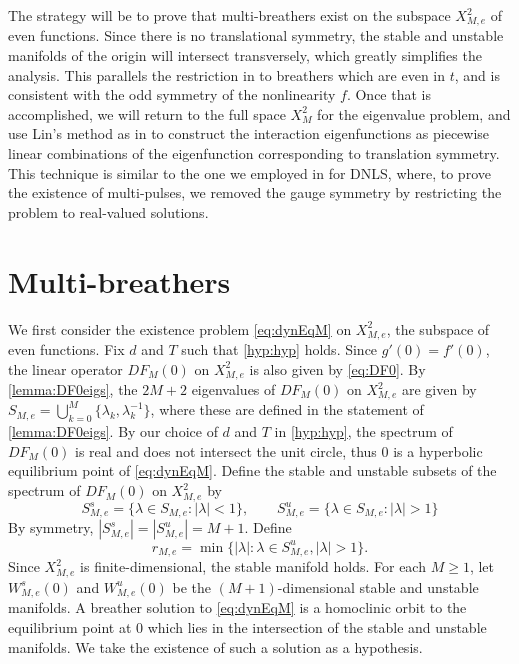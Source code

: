 \documentclass[12pt,reqno]{amsart}
\begin{document}
The strategy will be to prove that multi-breathers exist on the subspace $X_{M,e}^2$ of even functions. Since there is no translational symmetry, the stable and unstable manifolds of the origin will intersect transversely, which greatly simplifies the analysis. This parallels the restriction in \cite{Pelinovsky2012} to breathers which are even in $t$, and is consistent with the odd symmetry of the nonlinearity $f$. 
Once that is accomplished, we will return to the full space $X_{M}^2$ for the eigenvalue problem, and use Lin's method as in \cites{Parker2021,Parker2020,Sandstede1998} to construct the interaction eigenfunctions as piecewise linear combinations of the eigenfunction corresponding to translation symmetry. This technique is similar to the one we employed in \cite{Parker2020} for DNLS, where, to prove the existence of multi-pulses, we removed the gauge symmetry by restricting the problem to real-valued solutions.

\section{Multi-breathers}

We first consider the existence problem \cref{eq:dynEqM} on $X_{M,e}^2$, the subspace of even functions. Fix $d$ and $T$ such that \cref{hyp:hyp} holds. Since $g'(0) = f'(0)$, the linear operator $DF_M(0)$ on $X_{M,e}^2$ is also given by \cref{eq:DF0}. By \cref{lemma:DF0eigs}, the $2M+2$ eigenvalues of $DF_M(0)$ on $X_{M,e}^2$ are given by $S_{M,e} = \bigcup_{k=0}^M \{\lambda_k, \lambda_k^{-1} \}$, where these are defined in the statement of \cref{lemma:DF0eigs}. By our choice of $d$ and $T$ in \cref{hyp:hyp}, the spectrum of $DF_M(0)$ is real and does not intersect the unit circle, thus 0 is a hyperbolic equilibrium point of \cref{eq:dynEqM}. Define the stable and unstable subsets of the spectrum of $DF_M(0)$ on $X_{M,e}^2$ by
\[
S_{M,e}^s = \{ \lambda \in S_{M,e} : |\lambda| < 1\}, \qquad S_{M,e}^u = \{ \lambda \in S_{M,e} : |\lambda| > 1\}
\]
By symmetry, $|S_{M,e}^s| = |S_{M,e}^u| = M+1$. Define
\begin{equation}\label{eq:defrM}
r_{M,e} = \min \{ |\lambda| : \lambda \in S_{M,e}^u, |\lambda| > 1 \}.
\end{equation}
Since $X_{M,e}^2$ is finite-dimensional, the stable manifold holds. For each $M \geq 1$, let $W_{M,e}^s(0)$ and $W_{M,e}^u(0)$ be the $(M+1)$-dimensional stable and unstable manifolds. A breather solution to \cref{eq:dynEqM} is a homoclinic orbit to the equilibrium point at 0 which lies in the intersection of the stable and unstable manifolds. We take the existence of such a solution as a hypothesis.
\end{document}
